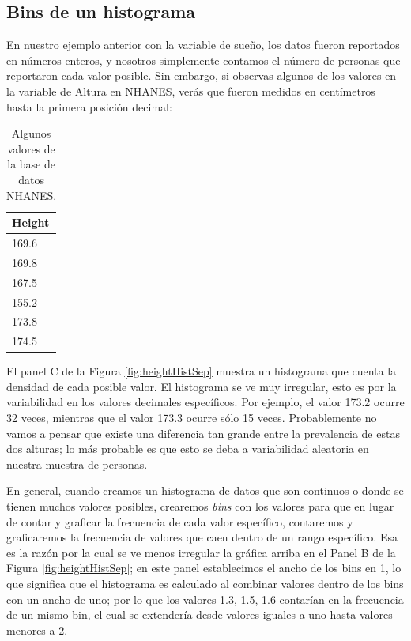 \documentclass[
  12pt,
]{book}
\begin{document}
\hypertarget{bins-de-un-histograma}{%
\subsection{Bins de un histograma}\label{bins-de-un-histograma}}

En nuestro ejemplo anterior con la variable de sueño, los datos fueron reportados en números enteros, y nosotros simplemente contamos el número de personas que reportaron cada valor posible. Sin embargo, si observas algunos de los valores en la variable de Altura en NHANES, verás que fueron medidos en centímetros hasta la primera posición decimal:

\begin{table}

\caption{\label{tab:unnamed-chunk-10}Algunos valores de la base de datos NHANES.}
\centering
\begin{tabular}[t]{l}
\hline
Height\\
\hline
169.6\\
\hline
169.8\\
\hline
167.5\\
\hline
155.2\\
\hline
173.8\\
\hline
174.5\\
\hline
\end{tabular}
\end{table}

El panel C de la Figura \ref{fig:heightHistSep} muestra un histograma que cuenta la densidad de cada posible valor. El histograma se ve muy irregular, esto es por la variabilidad en los valores decimales específicos. Por ejemplo, el valor 173.2 ocurre 32 veces, mientras que el valor 173.3 ocurre sólo 15 veces. Probablemente no vamos a pensar que existe una diferencia tan grande entre la prevalencia de estas dos alturas; lo más probable es que esto se deba a variabilidad aleatoria en nuestra muestra de personas.

En general, cuando creamos un histograma de datos que son continuos o donde se tienen muchos valores posibles, crearemos \emph{bins} con los valores para que en lugar de contar y graficar la frecuencia de cada valor específico, contaremos y graficaremos la frecuencia de valores que caen dentro de un rango específico. Esa es la razón por la cual se ve menos irregular la gráfica arriba en el Panel B de la Figura \ref{fig:heightHistSep}; en este panel establecimos el ancho de los bins en 1, lo que significa que el histograma es calculado al combinar valores dentro de los bins con un ancho de uno; por lo que los valores 1.3, 1.5, 1.6 contarían en la frecuencia de un mismo bin, el cual se extendería desde valores iguales a uno hasta valores menores a 2.
\end{document}
